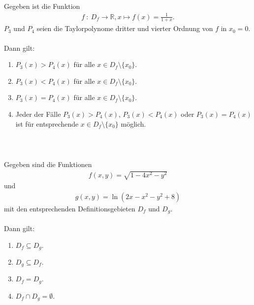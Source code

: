 \subsection*{}
Gegeben ist die Funktion
\begin{align*}
f \ : \ D_f  \to \mathbb{R}, x \mapsto f(x) = \frac{1}{1+x}.
\end{align*}
$ P_3 $ und $ P_4 $ seien die Taylorpolynome dritter und vierter Ordnung von $ f $ in $ x_0 = 0 $.\\
\\
Dann gilt:
\renewcommand{\labelenumi}{(\alph{enumi})}
\begin{enumerate}
\item 
$ P_3(x) > P_4(x) $ für alle $ x \in D_f \setminus \{ x_0\} $.
\item
$ P_3(x) < P_4(x) $ für alle $ x \in D_f \setminus \{ x_0\} $.
\item
$ P_3(x) = P_4(x) $ für alle $ x \in D_f \setminus \{ x_0\} $.
\item
Jeder der Fälle $ P_3(x) > P_4(x) $, $ P_3(x) < P_4(x) $ oder $ P_3(x) = P_4(x) $ ist für entsprechende $ x \in D_f \setminus \{ x_0\} $ möglich.
\end{enumerate}
\ \\
\subsection*{}
Gegeben sind die Funktionen
\begin{align*}
f(x,y) = \sqrt{1 - 4  x^2 - y^2}
\end{align*}
und
\begin{align*}
g(x,y)
= 
\ln(2  x - x^2 - y^2 + 8) 
\end{align*}
mit den entsprechenden Definitionsgebieten $ D_f $ und $ D_g $.\\
\\
Dann gilt:
\renewcommand{\labelenumi}{(\alph{enumi})}
\begin{enumerate}
\item 
$ D_f \subseteq D_g $.
\item
$ D_g \subseteq D_f $.
\item
$ D_f = D_g $.
\item
$ D_f \cap D_g = \emptyset $.
\end{enumerate}

\newpage
